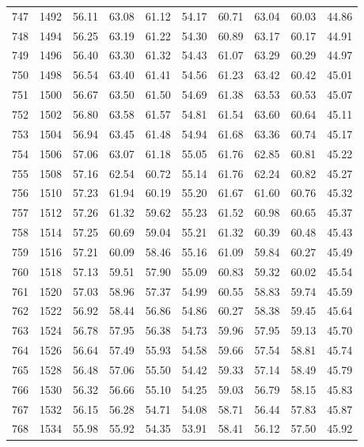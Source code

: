 \begin{longtable}{rrllllllll}
		747 & 1492 & 56.11 & 63.08 & 61.12 & 54.17 & 60.71 & 63.04 & 60.03 & 44.86 \\ 
		748 & 1494 & 56.25 & 63.19 & 61.22 & 54.30 & 60.89 & 63.17 & 60.17 & 44.91 \\ 
		749 & 1496 & 56.40 & 63.30 & 61.32 & 54.43 & 61.07 & 63.29 & 60.29 & 44.97 \\ 
		750 & 1498 & 56.54 & 63.40 & 61.41 & 54.56 & 61.23 & 63.42 & 60.42 & 45.01 \\ 
		751 & 1500 & 56.67 & 63.50 & 61.50 & 54.69 & 61.38 & 63.53 & 60.53 & 45.07 \\ 
		752 & 1502 & 56.80 & 63.58 & 61.57 & 54.81 & 61.54 & 63.60 & 60.64 & 45.11 \\ 
		753 & 1504 & 56.94 & 63.45 & 61.48 & 54.94 & 61.68 & 63.36 & 60.74 & 45.17 \\ 
		754 & 1506 & 57.06 & 63.07 & 61.18 & 55.05 & 61.76 & 62.85 & 60.81 & 45.22 \\ 
		755 & 1508 & 57.16 & 62.54 & 60.72 & 55.14 & 61.76 & 62.24 & 60.82 & 45.27 \\ 
		756 & 1510 & 57.23 & 61.94 & 60.19 & 55.20 & 61.67 & 61.60 & 60.76 & 45.32 \\ 
		757 & 1512 & 57.26 & 61.32 & 59.62 & 55.23 & 61.52 & 60.98 & 60.65 & 45.37 \\ 
		758 & 1514 & 57.25 & 60.69 & 59.04 & 55.21 & 61.32 & 60.39 & 60.48 & 45.43 \\ 
		759 & 1516 & 57.21 & 60.09 & 58.46 & 55.16 & 61.09 & 59.84 & 60.27 & 45.49 \\ 
		760 & 1518 & 57.13 & 59.51 & 57.90 & 55.09 & 60.83 & 59.32 & 60.02 & 45.54 \\ 
		761 & 1520 & 57.03 & 58.96 & 57.37 & 54.99 & 60.55 & 58.83 & 59.74 & 45.59 \\ 
		762 & 1522 & 56.92 & 58.44 & 56.86 & 54.86 & 60.27 & 58.38 & 59.45 & 45.64 \\ 
		763 & 1524 & 56.78 & 57.95 & 56.38 & 54.73 & 59.96 & 57.95 & 59.13 & 45.70 \\ 
		764 & 1526 & 56.64 & 57.49 & 55.93 & 54.58 & 59.66 & 57.54 & 58.81 & 45.74 \\ 
		765 & 1528 & 56.48 & 57.06 & 55.50 & 54.42 & 59.33 & 57.14 & 58.49 & 45.79 \\ 
		766 & 1530 & 56.32 & 56.66 & 55.10 & 54.25 & 59.03 & 56.79 & 58.15 & 45.83 \\ 
		767 & 1532 & 56.15 & 56.28 & 54.71 & 54.08 & 58.71 & 56.44 & 57.83 & 45.87 \\ 
		768 & 1534 & 55.98 & 55.92 & 54.35 & 53.91 & 58.41 & 56.12 & 57.50 & 45.92 \\ 

\end{longtable}

